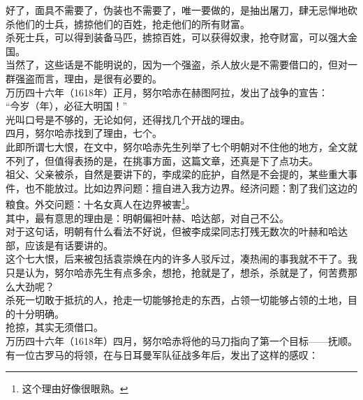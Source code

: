 \begin{multicols}{\theparacolNo}
好了，面具不需要了，伪装也不需要了，唯一要做的，是抽出屠刀，肆无忌惮地砍杀他们的士兵，掳掠他们的百姓，抢走他们的所有财富。\\

杀死士兵，可以得到装备马匹，掳掠百姓，可以获得奴隶，抢夺财富，可以强大金国。\\

当然了，这些话是不能明说的，因为一个强盗，杀人放火是不需要借口的，但对一群强盗而言，理由，是很有必要的。\\

万历四十六年（1618年）正月，努尔哈赤在赫图阿拉，发出了战争的宣告：\\

“今岁（年），必征大明国！”\\

光叫口号是不够的，无论如何，还得找几个开战的理由。\\

四月，努尔哈赤找到了理由，七个。\\

此即所谓七大恨，在文中，努尔哈赤先生列举了七个明朝对不住他的地方，全文就不列了，但值得表扬的是，在挑事方面，这篇文章，还真是下了点功夫。\\

祖父、父亲被杀，自然是要讲下的，李成梁的庇护，自然是不会提的，某些重大事件，也不能放过。比如边界问题：擅自进入我方边界。经济问题：割了我们这边的粮食。外交问题：十名女真人在边界被害\footnote{这个理由好像很眼熟。}。\\

其中，最有意思的理由是：明朝偏袒叶赫、哈达部，对自己不公。\\

对于这句话，明朝有什么看法不好说，但被李成梁同志打残无数次的叶赫和哈达部，应该是有话要讲的。\\

这个七大恨，后来被包括袁崇焕在内的许多人驳斥过，凑热闹的事我就不干了。我只是认为，努尔哈赤先生有点多余，想抢，抢就是了，想杀，杀就是了，何苦费那么大劲呢？\\

杀死一切敢于抵抗的人，抢走一切能够抢走的东西，占领一切能够占领的土地，目的十分明确。\\

抢掠，其实无须借口。\\

万历四十六年（1618年）四月，努尔哈赤将他的马刀指向了第一个目标——抚顺。\\

有一位古罗马的将领，在与日耳曼军队征战多年后，发出了这样的感叹：\\


\end{multicols}
